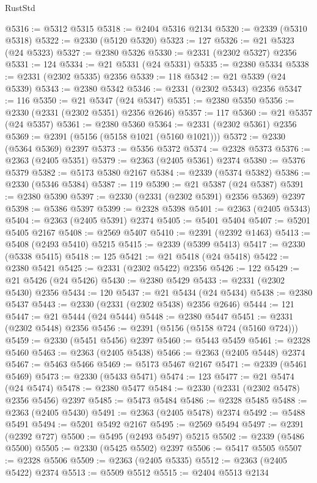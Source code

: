 \begin{lexlean}{RustStd}
\begin{coremodule}
@5316 := @5312 @5315
@5318 := @2404 @5316 @2134
@5320 := @2339 (@5310 @5318)
@5322 := @2330 (@5120 @5320)
@5323 := 127
@5326 := @21 @5323 (@24 @5323)
@5327 := @2380 @5326
@5330 := @2331 (@2302 @5327) @2356
@5331 := 124
@5334 := @21 @5331 (@24 @5331)
@5335 := @2380 @5334
@5338 := @2331 (@2302 @5335) @2356
@5339 := 118
@5342 := @21 @5339 (@24 @5339)
@5343 := @2380 @5342
@5346 := @2331 (@2302 @5343) @2356
@5347 := 116
@5350 := @21 @5347 (@24 @5347)
@5351 := @2380 @5350
@5356 := @2330 (@2331 (@2302 @5351) @2356 @2646)
@5357 := 117
@5360 := @21 @5357 (@24 @5357)
@5361 := @2380 @5360
@5364 := @2331 (@2302 @5361) @2356
@5369 := @2391 (@5156 (@5158 @1021 (@5160 @1021)))
@5372 := @2330 (@5364 @5369) @2397
@5373 := @5356 @5372
@5374 := @2328 @5373
@5376 := @2363 (@2405 @5351)
@5379 := @2363 (@2405 @5361) @2374
@5380 := @5376 @5379
@5382 := @5173 @5380 @2167
@5384 := @2339 (@5374 @5382)
@5386 := @2330 (@5346 @5384)
@5387 := 119
@5390 := @21 @5387 (@24 @5387)
@5391 := @2380 @5390
@5397 := @2330 (@2331 (@2302 @5391) @2356 @5369) @2397
@5398 := @5386 @5397
@5399 := @2328 @5398
@5401 := @2363 (@2405 @5343)
@5404 := @2363 (@2405 @5391) @2374
@5405 := @5401 @5404
@5407 := @5201 @5405 @2167
@5408 := @2569 @5407
@5410 := @2391 (@2392 @1463)
@5413 := @5408 (@2493 @5410) @5215
@5415 := @2339 (@5399 @5413)
@5417 := @2330 (@5338 @5415)
@5418 := 125
@5421 := @21 @5418 (@24 @5418)
@5422 := @2380 @5421
@5425 := @2331 (@2302 @5422) @2356
@5426 := 122
@5429 := @21 @5426 (@24 @5426)
@5430 := @2380 @5429
@5433 := @2331 (@2302 @5430) @2356
@5434 := 120
@5437 := @21 @5434 (@24 @5434)
@5438 := @2380 @5437
@5443 := @2330 (@2331 (@2302 @5438) @2356 @2646)
@5444 := 121
@5447 := @21 @5444 (@24 @5444)
@5448 := @2380 @5447
@5451 := @2331 (@2302 @5448) @2356
@5456 := @2391 (@5156 (@5158 @724 (@5160 @724)))
@5459 := @2330 (@5451 @5456) @2397
@5460 := @5443 @5459
@5461 := @2328 @5460
@5463 := @2363 (@2405 @5438)
@5466 := @2363 (@2405 @5448) @2374
@5467 := @5463 @5466
@5469 := @5173 @5467 @2167
@5471 := @2339 (@5461 @5469)
@5473 := @2330 (@5433 @5471)
@5474 := 123
@5477 := @21 @5474 (@24 @5474)
@5478 := @2380 @5477
@5484 := @2330 (@2331 (@2302 @5478) @2356 @5456) @2397
@5485 := @5473 @5484
@5486 := @2328 @5485
@5488 := @2363 (@2405 @5430)
@5491 := @2363 (@2405 @5478) @2374
@5492 := @5488 @5491
@5494 := @5201 @5492 @2167
@5495 := @2569 @5494
@5497 := @2391 (@2392 @727)
@5500 := @5495 (@2493 @5497) @5215
@5502 := @2339 (@5486 @5500)
@5505 := @2330 (@5425 @5502) @2397
@5506 := @5417 @5505
@5507 := @2328 @5506
@5509 := @2363 (@2405 @5335)
@5512 := @2363 (@2405 @5422) @2374
@5513 := @5509 @5512
@5515 := @2404 @5513 @2134

\end{coremodule}
\end{lexlean}
